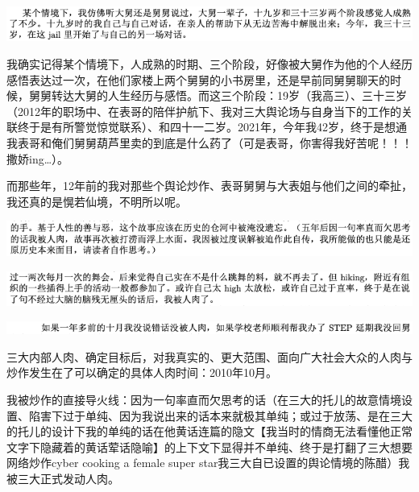 \documentclass[9pt, b5paper]{article}
\begin{document}
\begin{center}
\includegraphics[width=.9\linewidth]{./pic/p1p133.png}
\end{center}

我确实记得某个情境下，人成熟的时期、三个阶段，好像被大舅作为他的个人经历感悟表达过一次，在他们家楼上两个舅舅的小书房里，还是早前同舅舅聊天的时候，舅舅转达大舅的人生经历与感悟。而这三个阶段：19岁（我高三）、三十三岁（2012年的职场中、在表哥的陪伴护航下、我对三大舆论场与自身当下的工作的关联终于是有所警觉惊觉联系）、和四十一二岁。2021年，今年我42岁，终于是想通我表哥和俺们舅舅葫芦里卖的到底是什么药了（可是表哥，你害得我好苦呢！！！撒娇ing\ldots{}）。

而那些年，12年前的我对那些个舆论炒作、表哥舅舅与大表姐与他们之间的牵扯，我还真的是愰若仙境，不明所以呢。

\begin{center}
\includegraphics[width=.9\linewidth]{./pic/p1p32-6.png}
\end{center}

\begin{center}
\includegraphics[width=.9\linewidth]{./pic/p1p40-2.png}
\end{center}

\begin{center}
\includegraphics[width=.9\linewidth]{./pic/p1p70-1.png}
\end{center}

三大内部人肉、确定目标后，对我真实的、更大范围、面向广大社会大众的人肉与炒作发生在了可以确定的具体人肉时间：2010年10月。

我被炒作的直接导火线：因为一句率直而欠思考的话（在三大的托儿的故意情境设置、陷害下过于单纯、因为我说出来的话本来就极其单纯；或过于放荡、是在三大的托儿的设计下我的单纯的话在他黄话连篇的隐文【我当时的情商无法看懂他正常文字下隐藏着的黄话荤话隐喻】的上下文下显得并不单纯、终于是打翻了三大想要网络炒作cyber cooking a female super star我三大自已设置的舆论情境的陈醋）我被三大正式发动人肉。
\end{document}
